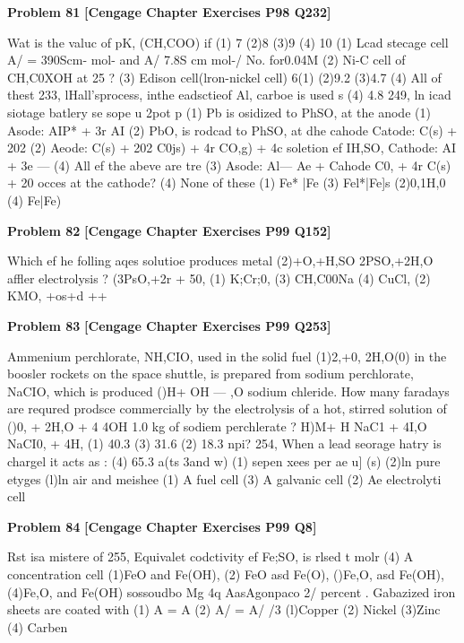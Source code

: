 \begin{problembox}
\textbf{Problem 81} \hfill \textbf{[Cengage Chapter Exercises P98 Q232]}
\label{q:ext-cng-th-81}

Wat is the valuc of pK, (CH,COO) if
(1) 7
(2)8
(3)9
(4) 10
(1) Lcad stecage cell
A/ = 390Scm- mol- and A/   7.8S cm mol-/ No.  for0.04M
(2) Ni-C cell
of CH,C0XOH at 25 ?
(3) Edison cell(lron-nickel cell)
6(1)
(2)9.2
(3)4.7
(4) All of thest
233, lHall'sprocess, inthe eadsctieof Al, carboe is used s
(4) 4.8
249, ln  icad siotage batlery
se sope  u 2pot p
(1) Pb is osidized to PhSO, at the anode
(1) Asode: AIP* + 3r
  AI
(2) PbO, is rodcad to PhSO, at dhe cahode
Catode: C(s) + 202
(2) Aeode: C(s) + 202
  C0js) + 4r
  CO,g) + 4c
soletion ef IH,SO,
Cathode: AI  + 3e
--- 
(4) All ef the abeve are tre
(3) Asode: Al---  Ae + 
Cahode C0, + 4r   C(s) + 20
occes at the cathode?
(4) None of these
(1) Fe* |Fe
(3) Fel*|Fe]s
(2)0,1H,0
(4) Fe|Fe)
\end{problembox}

\begin{problembox}
\textbf{Problem 82} \hfill \textbf{[Cengage Chapter Exercises P99 Q152]}
\label{q:ext-cng-th-82}

Which ef he folling aqes solutioe produces metal
(2)+O,+H,SO 2PSO,+2H,O
affler electrolysis ?
(3PsO,+2r + 50,
(1) K;Cr;0,
(3) CH,C00Na
(4) CuCl,
(2) KMO,
+os+d ++
\end{problembox}

\begin{problembox}
\textbf{Problem 83} \hfill \textbf{[Cengage Chapter Exercises P99 Q253]}
\label{q:ext-cng-th-83}

Ammenium perchlorate, NH,CIO, used in the solid fuel
(1)2,+0, 2H,O(0)
in the boosler rockets on the space shuttle, is prepared
from sodium perchlorate, NaCIO, which is produced
()H+ OH --- ,O
sodium chleride. How many faradays are requred prodsce
commercially by the electrolysis of a hot, stirred solution of
()0, + 2H,O + 4
  4OH
1.0 kg of sodiem perchlerate ?
H)M+
H
NaC1 + 4I,O   NaCI0, + 4H,
(1) 40.3
(3) 31.6
(2) 18.3
npi?
254, When a lead seorage hatry is chargel it acts as :
(4) 65.3
a(ts 3and w) (1)
sepen xees per ae u] (s)
(2)ln pure etyges
(l)ln air and meishee
(1) A fuel cell
(3) A galvanic cell
(2) Ae electrolyti cell
\end{problembox}

\begin{problembox}
\textbf{Problem 84} \hfill \textbf{[Cengage Chapter Exercises P99 Q8]}
\label{q:ext-cng-th-84}

Rst isa mistere of
255, Equivalet codctivity ef Fe;SO, is rlsed t molr
(4) A concentration cell
(1)FeO and Fe(OH),
(2) FeO asd Fe(O),
()Fe,O, asd Fe(OH),
(4)Fe,O, and Fe(OH)
sossoudbo Mg 4q AasAgonpaco
2/ percent . Gabazized iron sheets are coated with
(1) A = A
(2) A/  = A/ /3
(l)Copper
(2) Nickel
(3)Zinc
(4) Carben
\end{problembox}

